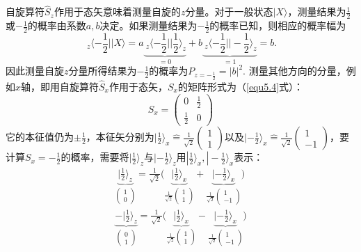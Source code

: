 自旋算符$\hat{S}_z$作用于态矢意味着测量自旋的$z$分量。对于一般状态$|X \rangle$，测量结果为$\frac{1}{2}$或$-\frac{1}{2}$的概率由系数$a, b$决定。如果测量结果为$-\frac{1}{2}$的概率已知，则相应的概率幅为
\begin{equation}
	\ _z\langle -\frac{1}{2} || X \rangle = a\underbrace{ \ _z\langle -\frac{1}{2} || \frac{1}{2} \rangle_z }_{ = 0} + b \underbrace{ \ _z \langle -\frac{1}{2} || -\frac{1}{2} \rangle_z }_{=1} = b.
\label{equ8.49}
\end{equation}
因此测量自旋$z$分量所得结果为$-\frac{1}{2}$的概率为$P_{z = -\frac{1}{2}} = |b|^2$. 测量其他方向的分量，例如$x$轴，即用自旋算符$\hat{S}_x$作用于态矢，$S_x$的矩阵形式为（\eqref{equ5.4}式）：
\begin{equation}
	S_x =
		\begin{pmatrix}
			0 & \frac{1}{2} \\
			\frac{1}{2} & 0
		\end{pmatrix}
\label{equ8.50}
\end{equation}
它的本征值仍为$\pm \frac{1}{2}$，本征矢分别为$|\frac{1}{2} \rangle_x \hat{=} \frac{1}{\sqrt{2}} \begin{pmatrix} 1 \\ 1 \end{pmatrix}$以及$|-\frac{1}{2} \rangle_x \hat{=} \frac{1}{\sqrt{2}} \begin{pmatrix} 1 \\ -1 \end{pmatrix}$，要计算$S_x = -\frac{1}{2}$的概率，需要将$|\frac{1}{2} \rangle_z$与$|-\frac{1}{2} \rangle_z$用$|\frac{1}{2} \rangle_x, |-\frac{1}{2} \rangle_x$表示：
\begin{align}
	\underbrace{|\frac{1}{2} \rangle_z}_{\begin{pmatrix} 1 \\ 0 \end{pmatrix} } = \frac{1}{\sqrt{2}} \Big( \underbrace{ |\frac{1}{2} \rangle_x }_{ \frac{1}{\sqrt{2}} \begin{pmatrix} 1 \\ 1 \end{pmatrix} } + \underbrace{ |-\frac{1}{2} \rangle_x}_{\frac{1}{\sqrt{2}} \begin{pmatrix} 1 \\ -1 \end{pmatrix} } \Big)
\label{equ8.51} \\
	\underbrace{-|\frac{1}{2} \rangle_z}_{\begin{pmatrix} 0 \\ 1 \end{pmatrix} } = \frac{1}{\sqrt{2}} \Big( \underbrace{ |\frac{1}{2} \rangle_x }_{ \frac{1}{\sqrt{2}} \begin{pmatrix} 1 \\ 1 \end{pmatrix} } - \underbrace{ |-\frac{1}{2} \rangle_x}_{\frac{1}{\sqrt{2}} \begin{pmatrix} 1 \\ -1 \end{pmatrix} } \Big)
\label{equ8.52}
\end{align}
